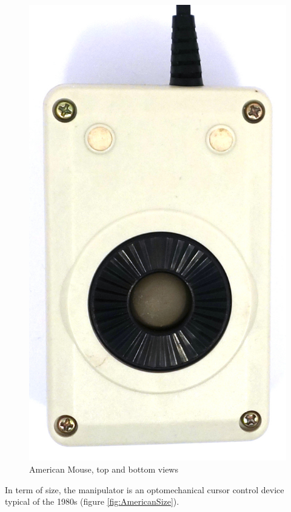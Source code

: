 \documentclass[11pt, a4paper]{article}
\begin{document}
\begin{figure}[h]
    \includegraphics[scale=0.7]{1986_american_mouse/bottom_60.jpg}
    \caption{American Mouse, top and bottom views}
    \label{AmericanTopAndBottom}
\end{figure}

In term of size, the manipulator is an optomechanical cursor control device typical of the 1980s (figure \ref{fig:AmericanSize}).
\end{document}
